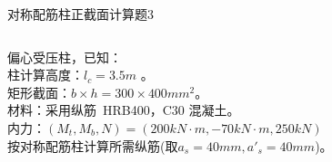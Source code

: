
\begin{frame}[plain]{ 对称配筋柱正截面计算题3 }
\begin{columns}[onlytextwidth]
\begin{column}{0.75\textwidth}
偏心受压柱，已知：\\
柱计算高度：$l_c= 3.5 m$ 。 \\
矩形截面：$b \times h = 300 \times 400 mm^2$。\\
材料：采用纵筋~HRB400，C30 混凝土。\\
内力：$(M_t, M_b, N) = ( 200 kN\cdot m, -70 kN\cdot m, 250 kN)$ \\
按对称配筋柱计算所需纵筋(取$a_s = 40 mm, a'_s = 40 mm$)。\\
\end{column}

\begin{column}{0.25\textwidth}
\begin{center}
\end{center}
\end{column}

\end{columns}
\end{frame}

